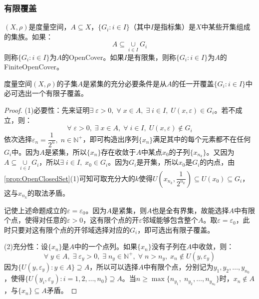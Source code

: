 \subsubsection{有限覆盖}
\begin{definition}
	$(X,\rho)$是度量空间，$A\subseteq X$，$\{G_i:i\in I\}$（其中$I$是指标集）是$X$中某些开集组成的集族。如果：
	\begin{equation*}
		A\subseteq\underset{i\in I}{\cup}G_i
	\end{equation*}
	则称$\{G_i:i\in I\}$为$A$的\gls{OpenCover}。如果$I$是有限集，则称$\{G_i:i\in I\}$为$A$的\gls{FiniteOpenCover}。
\end{definition}
\begin{theorem}[有限覆盖定理]\label{theo:FiniteOpenCover}
	度量空间$(X,\rho)$的子集$A$是紧集的充分必要条件是从$A$的任一开覆盖$\{G_i:i\in I\}$中必可选出一个有限子覆盖。
\end{theorem}
\begin{proof}
	(1)必要性：先来证明$\exists\;\varepsilon>0,\;\forall\;x\in A,\;\exists\;i\in I,\;U(x,\varepsilon)\in G_i$。若不成立，则：
	\begin{equation*}
		\forall\;\varepsilon>0,\;\exists\;x\in A,\;\forall\;i\in I,\;U(x,\varepsilon)\notin G_i
	\end{equation*}
	依次选择$\varepsilon_n=\dfrac{1}{2^n},\;n\in\mathbb{N}^+$，即可构造出序列$\{x_n\}$满足其中的每个元素都不在任何$G_i$中。因为$A$是紧集，所以$\{x_n\}$存在收敛于$A$中某点$x_0$的子列$\{x_{n_k}\}$。又因为$A\subseteq\underset{i\in I}{\cup}G_i$，所以$\exists\;i\in I,\;x_0\in G_i$。因为$G_i$是开集，所以$x_0$是$G_i$的内点，由\cref{prop:OpenClosedSet}(1)可知可取充分大的$k$使得$U\left(x_{n_k},\dfrac{1}{2^{n_k}}\right)\subseteq U(x_0)\subseteq G_i$，这与$x_{n_k}$的取法矛盾。\par
	记使上述命题成立的$\varepsilon=\varepsilon_0$。因为$A$是紧集，则$A$也是全有界集，故能选择$A$中有限个点，使得对任意的$\varepsilon>0$，这有限个点的开$\varepsilon$邻域能够包含整个$A$。取$\varepsilon=\varepsilon_0$，此时只要对这有限个点的开邻域选择对应的$G_i$，即可选出有限子覆盖。\par
	(2)充分性：设$\{x_n\}$是$A$中的一个点列。如果$\{x_n\}$没有子列在$A$中收敛，则：
	\begin{equation*}
		\forall\;y\in A,\;\exists\;\varepsilon_y>0,\;\exists\;n_y\in\mathbb{N}^+,\;\forall\;n>n_y,\;x_n\notin U(y,\varepsilon_y)
	\end{equation*}
	因为$\{U(y,\varepsilon_y):y\in A\}\supseteq A$，所以可以选择$A$中有限个点，分别记为$y_1,y_2,\dots,y_{n_0}$，使得$\{U(y_i,\varepsilon_y):i=1,2,\dots,n_0\}\supseteq A$。当$n\geqslant
	\max\{n_{y_1},\;n_{y_2},\dots,n_{y_{n_0}}\}$时，$x_n\notin A$，与$\{x_n\}\subseteq A$矛盾。
\end{proof}
